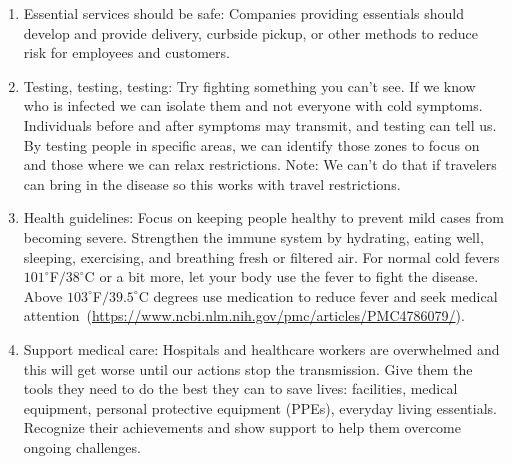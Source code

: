 \documentclass[onecolumn,journal]{IEEEtran}
\begin{document}
\begin{multicols}{2}
\begin{enumerate}
\item Essential services should be safe: Companies providing essentials should develop and provide delivery, curbside pickup, or other methods to reduce risk for employees and customers.
\item Testing, testing, testing: Try fighting something you can't see. If we know who is infected we can isolate them and not everyone with cold symptoms. Individuals before and after symptoms may transmit, and testing can tell us. By testing people in specific areas, we can identify those zones to focus on and those where we can relax restrictions. Note: We can't do that if travelers can bring in the disease so this works with travel restrictions.
\item Health guidelines: Focus on keeping people healthy to prevent mild cases from becoming severe. Strengthen the immune system by hydrating, eating well, sleeping, exercising, and breathing fresh or filtered air. For normal cold fevers $101^\circ$F$/38^\circ$C or a bit more, let your body use the fever to fight the disease. Above $103^\circ$F$/39.5^\circ$C degrees use medication to reduce fever and seek medical attention~(\url{https://www.ncbi.nlm.nih.gov/pmc/articles/PMC4786079/}).
\item Support medical care: Hospitals and healthcare workers are overwhelmed and this will get worse until our actions stop the transmission. Give them the tools they need to do the best they can to save lives: facilities, medical equipment, personal protective equipment (PPEs), everyday living essentials. Recognize their achievements and show support to help them overcome ongoing challenges.
\end{enumerate}

\end{multicols}




% 
\end{document}
